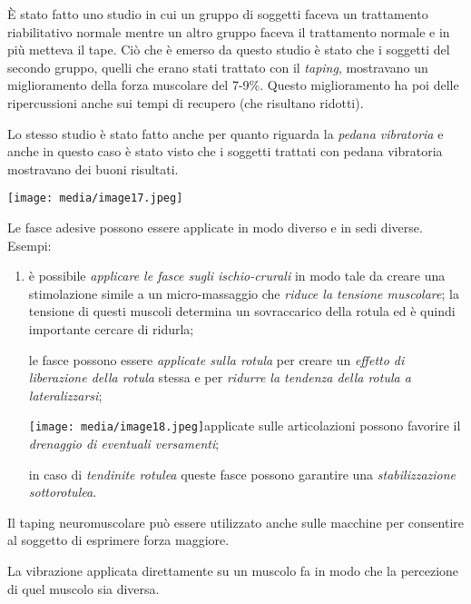 \documentclass[]{article}
\begin{document}
È stato fatto uno studio in cui un gruppo di soggetti faceva un
trattamento riabilitativo normale mentre un altro gruppo faceva il
trattamento normale e in più metteva il tape. Ciò che è emerso da questo
studio è stato che i soggetti del secondo gruppo, quelli che erano stati
trattato con il \emph{taping}, mostravano un miglioramento della forza
muscolare del 7-9\%. Questo miglioramento ha poi delle ripercussioni
anche sui tempi di recupero (che risultano ridotti).

Lo stesso studio è stato fatto anche per quanto riguarda la \emph{pedana
vibratoria} e anche in questo caso è stato visto che i soggetti trattati
con pedana vibratoria mostravano dei buoni risultati.

\texttt{[image: media/image17.jpeg]}

Le fasce adesive possono essere applicate in modo diverso e in sedi
diverse. Esempi:

\begin{enumerate}
\def\labelenumi{\arabic{enumi}.}
\item
  è possibile \emph{applicare le fasce sugli ischio-crurali} in modo
  tale da creare una stimolazione simile a un micro-massaggio che
  \emph{riduce la tensione muscolare}; la tensione di questi muscoli
  determina un sovraccarico della rotula ed è quindi importante cercare
  di ridurla;

  le fasce possono essere \emph{applicate sulla rotula} per creare un
  \emph{effetto di liberazione della rotula} stessa e per \emph{ridurre
  la tendenza della rotula a lateralizzarsi};

  \texttt{[image: media/image18.jpeg]}applicate
  sulle articolazioni possono favorire il \emph{drenaggio di eventuali
  versamenti};

  in caso di \emph{tendinite rotulea} queste fasce possono garantire una
  \emph{stabilizzazione sottorotulea.}
\end{enumerate}

Il taping neuromuscolare può essere utilizzato anche sulle macchine per
consentire al soggetto di esprimere forza maggiore.

La vibrazione applicata direttamente su un muscolo fa in modo che la
percezione di quel muscolo sia diversa.
\end{document}
